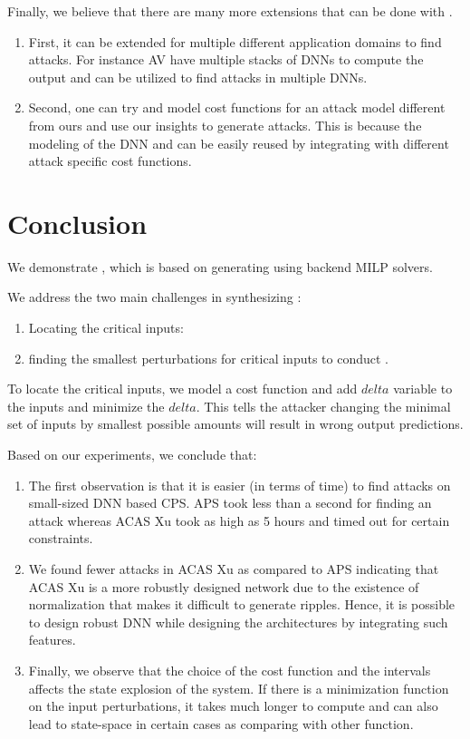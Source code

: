 Finally, we believe that there are many more extensions that can be done with \tool. 
\begin{enumerate}
	\item First, it can be extended for multiple different application domains to find attacks.
	For instance \ac{AV} have multiple stacks of \ac{DNN}s to compute the output and \tool can be utilized to find attacks in multiple \ac{DNN}s.
	\item Second, one can try and model cost functions for an attack model different from ours and use our insights to generate attacks.
	This is because the modeling of the \ac{DNN} and \tool can be easily reused by integrating with different attack specific cost functions. 
\end{enumerate}


\section{Conclusion}
We demonstrate \tool, which is based on generating \attack using backend \ac{MILP} solvers. 

We address the two main challenges in synthesizing \attack: 
\begin{enumerate}
	\item Locating the critical inputs: 
	
	\item finding the smallest perturbations for critical inputs to conduct \attack.
	
\end{enumerate}
To locate the critical inputs, we model a cost function and add $delta$ variable to the inputs and minimize the $delta$. 
This tells the attacker changing the minimal set of inputs by smallest possible amounts will result in wrong output predictions.

Based on our experiments, we conclude that:

\begin{enumerate}
	\item The first observation is that it is easier (in terms of time) to find attacks on small-sized DNN based CPS. 
	APS took less than a second for finding an attack whereas ACAS Xu took as high as 5 hours and timed out for certain constraints. 
	
	\item We found fewer attacks in ACAS Xu as compared to APS indicating  that ACAS Xu is a more robustly designed network due to the existence of normalization that makes it difficult to generate ripples. 
	Hence, it is possible to design robust \ac{DNN} while designing the architectures by integrating such features. 
	
	\item Finally, we observe that the choice of the cost function and the intervals affects the state explosion of the system. 
	If there is a minimization function on the input perturbations, it takes much longer to compute and can also lead to state-space in certain cases as comparing with other function. 
\end{enumerate}




